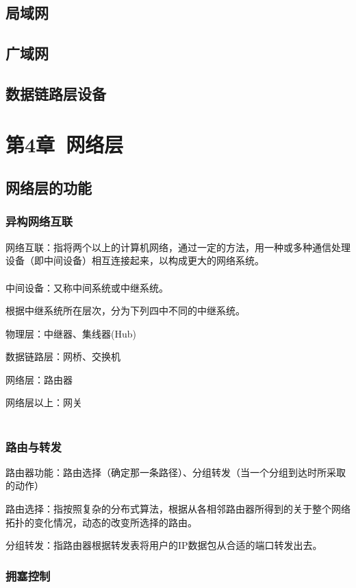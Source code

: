 \documentclass{ctexart}
\begin{document}
\subsection{局域网}

\subsection{广域网}

\subsection{数据链路层设备}


\section{第4章\ 网络层}

\subsection{网络层的功能}

\subsubsection{异构网络互联}
网络互联：指将两个以上的计算机网络，通过一定的方法，用一种或多种通信处理设备（即中间设备）相互连接起来，以构成更大的网络系统。
\\\\
中间设备：又称中间系统或中继系统。

根据中继系统所在层次，分为下列四中不同的中继系统。

物理层：中继器、集线器(Hub)

数据链路层：网桥、交换机

网络层：路由器

网络层以上：网关
\\\\

\subsubsection{路由与转发}
路由器功能：路由选择（确定那一条路径）、分组转发（当一个分组到达时所采取的动作）

路由选择：指按照复杂的分布式算法，根据从各相邻路由器所得到的关于整个网络拓扑的变化情况，动态的改变所选择的路由。

分组转发：指路由器根据转发表将用户的IP数据包从合适的端口转发出去。

\subsubsection{拥塞控制}
\end{document}
